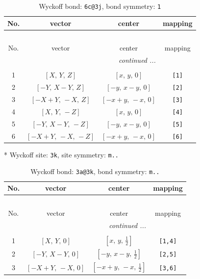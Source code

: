 \documentclass[fleqn,8pt]{jsarticle}
\begin{document}
\renewcommand{\arraystretch}{1.2}
\begin{longtable}{cccc}
\caption{Wyckoff bond: {\tt 6c@3j}, bond symmetry: {\tt 1}}
 \\
 \hline \hline
No. & vector & center & mapping \\ \hline \endfirsthead

\multicolumn{3}{l}{\tablename\ \thetable{}} \\
 \hline \hline
No. & vector & center & mapping \\ \hline \endhead

 \hline \hline
\multicolumn{3}{r}{\footnotesize\it continued ...} \\ \endfoot

 \hline \hline
\multicolumn{3}{r}{} \\ \endlastfoot

1 & $\left[ X,\, Y,\, Z \right]$ & $\left[ x,\, y,\, 0 \right]$ & {\tt [1]} \\ \hline
2 & $\left[ - Y,\, X - Y,\, Z \right]$ & $\left[ - y,\, x - y,\, 0 \right]$ & {\tt [2]} \\ \hline
3 & $\left[ - X + Y,\, - X,\, Z \right]$ & $\left[ - x + y,\, - x,\, 0 \right]$ & {\tt [3]} \\ \hline
4 & $\left[ X,\, Y,\, - Z \right]$ & $\left[ x,\, y,\, 0 \right]$ & {\tt [4]} \\ \hline
5 & $\left[ - Y,\, X - Y,\, - Z \right]$ & $\left[ - y,\, x - y,\, 0 \right]$ & {\tt [5]} \\ \hline
6 & $\left[ - X + Y,\, - X,\, - Z \right]$ & $\left[ - x + y,\, - x,\, 0 \right]$ & {\tt [6]} \\
\end{longtable}
* Wyckoff site: {\tt 3k}, site symmetry: {\tt m..}
\renewcommand{\arraystretch}{1.2}
\begin{longtable}{cccc}
\caption{Wyckoff bond: {\tt 3a@3k}, bond symmetry: {\tt m..}}
 \\
 \hline \hline
No. & vector & center & mapping \\ \hline \endfirsthead

\multicolumn{3}{l}{\tablename\ \thetable{}} \\
 \hline \hline
No. & vector & center & mapping \\ \hline \endhead

 \hline \hline
\multicolumn{3}{r}{\footnotesize\it continued ...} \\ \endfoot

 \hline \hline
\multicolumn{3}{r}{} \\ \endlastfoot

1 & $\left[ X,\, Y,\, 0 \right]$ & $\left[ x,\, y,\, \frac{1}{2} \right]$ & {\tt [1,4]} \\ \hline
2 & $\left[ - Y,\, X - Y,\, 0 \right]$ & $\left[ - y,\, x - y,\, \frac{1}{2} \right]$ & {\tt [2,5]} \\ \hline
3 & $\left[ - X + Y,\, - X,\, 0 \right]$ & $\left[ - x + y,\, - x,\, \frac{1}{2} \right]$ & {\tt [3,6]} \\
\end{longtable}
\end{document}
